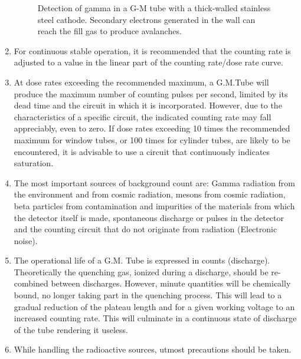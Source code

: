 \documentclass[%
 reprint,
nofootinbib,
 amsmath,amssymb,
 aps,
floatfix,
]{revtex4-2}
\begin{document}
\begin{enumerate}
\begin{figure}
        \caption{Detection of gamma in a G-M tube with a thick-walled stainless steel cathode. Secondary electrons generated in the wall can reach the fill gas to produce avalanches.}
        \label{fig:disc-4}
    \end{figure}
    \item For continuous stable operation, it is recommended that the counting rate is adjusted to a value in the linear part of the counting rate/dose rate curve.
    \item At dose rates exceeding the recommended maximum, a G.M.Tube will produce the maximum number of counting pulses per second, limited by its dead time and the circuit in which it is incorporated. However, due to the characteristics of a specific circuit, the indicated counting rate may fall appreciably, even to zero. If dose rates exceeding 10 times the recommended maximum for window tubes, or 100 times for cylinder tubes, are likely to be encountered, it is advisable to use a circuit that continuously indicates saturation.
    \item The most important sources of background count are: Gamma radiation from the environment and from cosmic radiation, mesons from cosmic radiation, beta particles from contamination and impurities of the materials from which the detector itself is made, spontaneous discharge or pulses in the detector and the counting circuit that do not originate from radiation (Electronic noise).
    \item The operational life of a G.M. Tube is expressed in counts (discharge). Theoretically the quenching gas, ionized during a discharge, should be re-combined between discharges. However, minute quantities will be chemically bound, no longer taking part in the quenching process. This will lead to a gradual reduction of the plateau length and for a given working voltage to an increased counting rate. This will culminate in a continuous state of discharge of the tube rendering it useless.
    \item While handling the radioactive sources, utmost precautions should be taken.
\end{enumerate}
\end{document}
